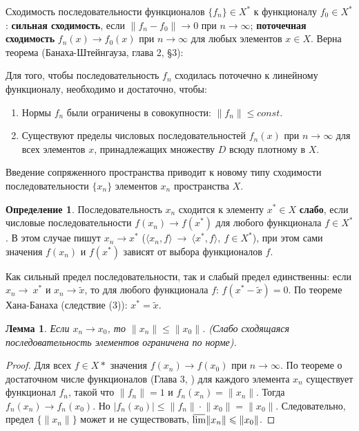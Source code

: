 \documentclass[12pt,a4paper,titlepage,oneside]{book}
\newcommand{\overbar}[1]{\mkern 1.5mu\overline{\mkern-1.5mu#1\mkern-1.5mu}\mkern 1.5mu}
\theoremstyle{definition}
\newtheorem*{definition}{Определение}
\theoremstyle{plain}
\theoremstyle{break}
\theoremstyle{remark}
\theoremstyle{remark}
\theoremstyle{remark}
\theoremstyle{remark}
\theoremstyle{plain}
\newtheorem*{lemma}{Лемма}
\theoremstyle{plain}
\begin{document}
Сходимость последовательности функционалов $\{f_n\}\in X^*$ к функционалу $f_0\in X^*$: \textbf{сильная сходимость}, если $\lVert f_n - f_0\rVert \to 0$ при $n\to\infty$; \textbf{поточечная сходимость} $f_n(x)\to f_0(x)$ при $n\to\infty$ для любых элементов $x\in X$. Верна теорема (Банаха-Штейнгауза, глава 2, \S 3):

Для того, чтобы последовательность $f_n$ сходилась поточечно к линейному функционалу, необходимо и достаточно, чтобы:

\begin{enumerate}
\item Нормы $f_n$ были ограничены в совокупности: $\lVert f_n\rVert \leqslant const$.
\item Существуют пределы числовых последовательностей $f_n(x)$ при $n\to\infty$ для всех элементов $x$, принадлежащих множеству $D$
    всюду плотному в $X$.
\end{enumerate}

Введение сопряженного пространства приводит к новому типу сходимости последовательности $\{x_n\}$ элементов $x_n$ пространства $X$.

\begin{definition}
Последовательность $x_n$ сходится к элементу $x^* \in X$ \textbf{слабо}, если числовые последовательности $f(x_n) \rightarrow f(x^*)$ для любого функционала $f \in X^*$. В этом случае пишут $x_n \rightarrow x^*$ \big($ \langle x_n,f \rangle  \ \rightarrow \  \langle x^*, f \rangle ,\ f \in X^*$\big), при этом сами значения $f(x_n)$ и $f(x^*)$ зависят от выбора функционалов $f$.

Как сильный предел последовательности, так и слабый предел единственны: если $x_n\rightarrow~x^*$ и $x_n \rightarrow \widetilde{x}$, то для любого функционала $f$: $f(x^*-\widetilde{x})=0$. По теореме Хана-Банаха (следствие (3)): $x^*=\widetilde{x}$.
\end{definition}

\begin{lemma}
Если $x_n \rightarrow x_0$, то $\lVert x_n \rVert \leqslant \lVert x_0 \rVert$. (Слабо сходящаяся последовательность элементов ограничена по норме).
\end{lemma}
\begin{proof}
Для всех $f \in X*$ значения $f(x_n) \rightarrow f(x_0)$ при $n \rightarrow \infty$. По теореме о достаточном числе функционалов (Глава 3, ) для каждого элемента $x_n$ существует функционал $f_n$, такой что $\lVert f_n \rVert =1$ и $f_n(x_n)=\lVert x_n \rVert$. Тогда $f_n(x_n) \rightarrow f_n(x_0)$. Но $|f_n(x_0)| \leqslant \lVert f_n \rVert \cdot \lVert x_0 \rVert = \lVert x_0 \rVert$. Следовательно, предел $\{ \lVert x_n \rVert \}$ может и не существовать, $\overbar{\lim}\lVert x_n \rVert \leqslant \lVert x_0 \rVert$.
\end{proof}
\end{document}

